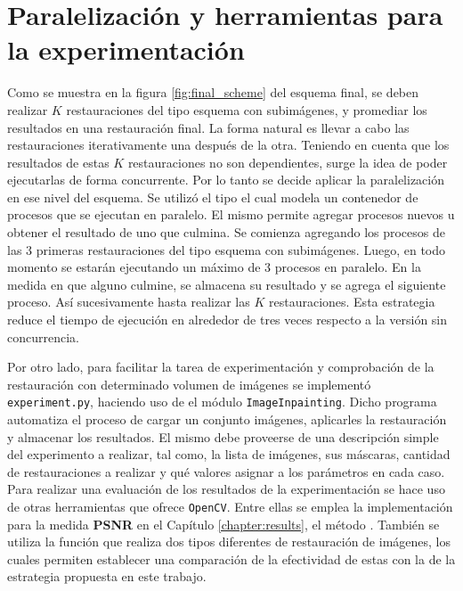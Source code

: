 \section{Paralelizaci\'on y herramientas para la experimentaci\'on}

Como se muestra en la figura \ref{fig:final_scheme} del esquema final, se deben realizar $K$ restauraciones del tipo esquema con subim\'agenes, y promediar los resultados en una restauraci\'on final. La forma natural es llevar a cabo las restauraciones iterativamente una despu\'es de la otra. Teniendo en cuenta que los resultados de estas $K$ restauraciones no son dependientes, surge la idea de poder ejecutarlas de forma concurrente. Por lo tanto se decide aplicar la paralelizaci\'on en ese nivel del esquema. Se utiliz\'o el tipo  el cual modela un contenedor de procesos que se ejecutan en paralelo. El mismo permite agregar procesos nuevos u obtener el resultado de uno que culmina. Se comienza agregando los procesos de las 3 primeras restauraciones del tipo esquema con subim\'agenes. Luego, en todo momento se estar\'an ejecutando un m\'aximo de 3 procesos en paralelo. En la medida en que alguno culmine, se almacena su resultado y se agrega el siguiente proceso. As\'i sucesivamente hasta realizar las $K$ restauraciones. Esta estrategia reduce el tiempo de ejecución en alrededor de tres veces respecto a la versión sin concurrencia.

Por otro lado, para facilitar la tarea de experimentaci\'on y comprobaci\'on de la restauraci\'on con determinado volumen de im\'agenes se implement\'o \texttt{experiment.py}, haciendo uso de el m\'odulo \texttt{ImageInpainting}. Dicho programa automatiza el proceso de cargar un conjunto im\'agenes, aplicarles la restauraci\'on y almacenar los resultados. El mismo debe proveerse de una descripci\'on simple del experimento a realizar, tal como, la lista de im\'agenes, sus m\'ascaras, cantidad de restauraciones a realizar y qu\'e valores asignar a los par\'ametros en cada caso. Para realizar una evaluaci\'on de los resultados de la experimentaci\'on se hace uso de otras herramientas que ofrece \texttt{OpenCV}. Entre ellas se emplea la implementaci\'on para la medida \textbf{PSNR} \cite{enwiki:psnr} en el Cap\'itulo \ref{chapter:results}, el m\'etodo . Tambi\'en se utiliza la funci\'on  que realiza dos tipos diferentes de restauraci\'on de im\'agenes, los cuales permiten establecer una comparación de la efectividad de estas con la de la estrategia  propuesta en este trabajo.